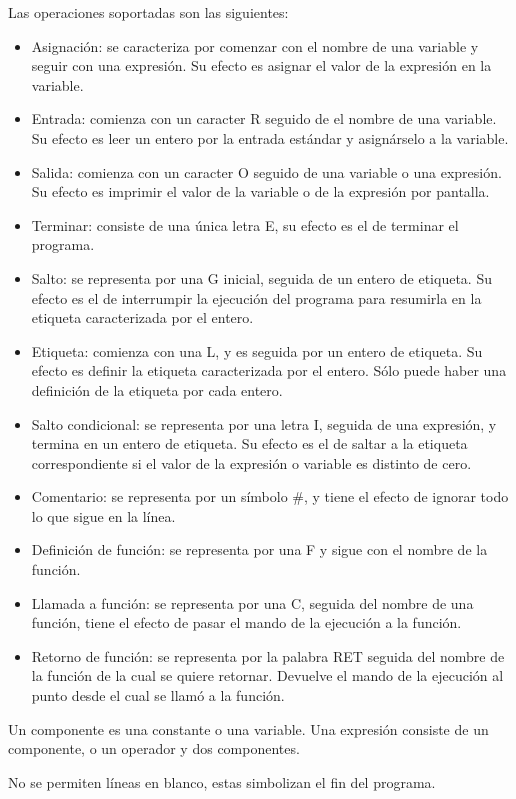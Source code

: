 \documentclass[12pt,spanish]{article}
\begin{document}
\noindent Las operaciones soportadas son las siguientes:
\begin{itemize}
\item{Asignación: se caracteriza por comenzar con el nombre de una variable y seguir con una expresión. Su efecto es asignar el valor de la expresión en la variable.}
\item{Entrada: comienza con un caracter R seguido de el nombre de una variable. Su efecto es leer un entero por la entrada estándar y asignárselo a la variable.}
\item{Salida: comienza con un caracter O seguido de una variable o una expresión. Su efecto es imprimir el valor de la variable o de la expresión por pantalla.}
\item{Terminar: consiste de una única letra E, su efecto es el de terminar el programa.}
\item{Salto: se representa por una G inicial, seguida de un entero de etiqueta. Su efecto es el de interrumpir la ejecución del programa para resumirla en la etiqueta caracterizada por el entero.}
\item{Etiqueta: comienza con una L, y es seguida por un entero de etiqueta. Su efecto es definir la etiqueta caracterizada por el entero. Sólo puede haber una definición de la etiqueta por cada entero.}
\item{Salto condicional: se representa por una letra I, seguida de una expresión, y termina en un entero de etiqueta. Su efecto es el de saltar a la etiqueta correspondiente si el valor de la expresión o variable es distinto de cero.}
\item{Comentario: se representa por un símbolo \#, y tiene el efecto de ignorar todo lo que sigue en la línea.}
\item{Definición de función: se representa por una F y sigue con el nombre de la función.}
\item{Llamada a función: se representa por una C, seguida del nombre de una función, tiene el efecto de pasar el mando de la ejecución a la función.}
\item{Retorno de función: se representa por la palabra RET seguida del nombre de la función de la cual se quiere retornar. Devuelve el mando de la ejecución al punto desde el cual se llamó a la función.}
\end{itemize}

\noindent Un componente es una constante o una variable. Una expresión consiste de un componente, o un operador y dos componentes.

\noindent No se permiten líneas en blanco, estas simbolizan el fin del programa.
\end{document}
